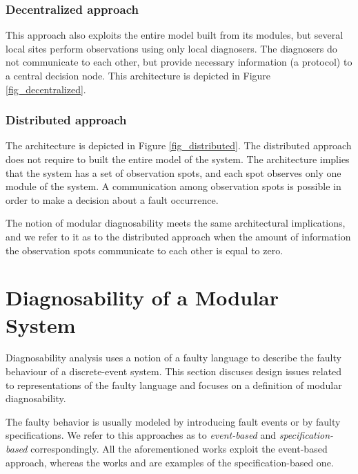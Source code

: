 \documentclass[letterpaper, 10pt, conference]{ieeeconf}
\begin{document}
\subsubsection{Decentralized approach}
This approach also exploits the entire model built from its modules, but several
local sites perform observations using only local diagnosers.
The diagnosers do not communicate to each other, but provide necessary
information (a protocol) to a central decision node. This architecture is
depicted in Figure \ref{fig_decentralized}.

\subsubsection{Distributed approach}
The architecture is depicted in Figure \ref{fig_distributed}.
The distributed approach does not require to built the entire model of the
system. The architecture implies that the system has a set of observation spots,
and each spot observes only one module of the system. A communication among
observation spots is possible in order to make a decision about a fault
occurrence. 

The notion of modular diagnosability meets the same architectural implications,
and we refer to it as to the distributed approach when the amount of information
the observation spots communicate to each other is equal to zero.


\section{Diagnosability of a Modular System}
\label{sec:Diagnosability}

Diagnosability analysis uses a notion of a faulty language to describe the
faulty behaviour of a discrete-event system. This section discuses design issues
related to representations of the faulty language and focuses on a definition
of modular diagnosability.

The faulty behavior is usually modeled by introducing fault events or by faulty
specifications. We refer to this approaches as to \emph{event-based} and
\emph{specification-based} correspondingly. All the aforementioned works exploit
the event-based approach, whereas the works \cite{zhou_decentralized_2008} and
\cite{sartini_methodology_2010} are examples of the specification-based one.
\end{document}
